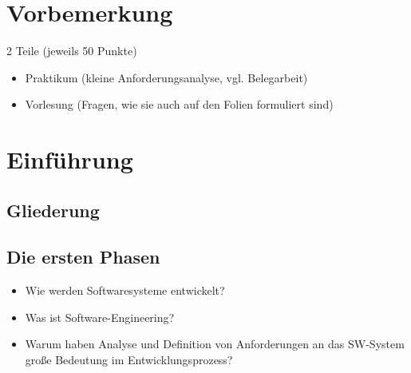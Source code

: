 \newcommand{\customDir}{../}








%



\maketitle
\newpage
\tableofcontents
\newpage
\chapter*{Vorbemerkung}
2 Teile (jeweils 50 Punkte)
\begin{itemize}
\item Praktikum (kleine Anforderungsanalyse, vgl. Belegarbeit)
\item Vorlesung (Fragen, wie sie auch auf den Folien formuliert sind)
\end{itemize}

\chapter{Einführung}

\section{Gliederung}

\section{Die ersten Phasen}
\begin{itemize}
\item Wie werden Softwaresysteme entwickelt?
\item Was ist Software-Engineering?
\item Warum haben Analyse und Definition von Anforderungen an das SW-System große Bedeutung im Entwicklungsprozess?
\end{itemize}

